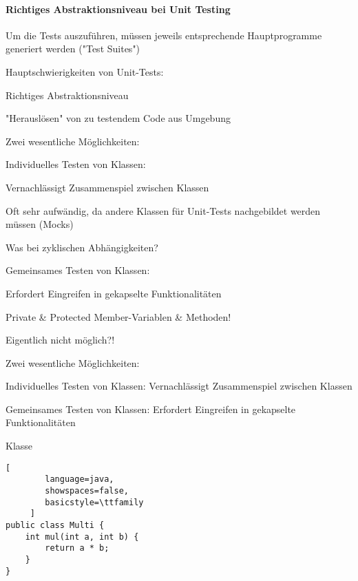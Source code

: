 \documentclass[10pt]{article}
\begin{document}
\paragraph{Richtiges Abstraktionsniveau bei Unit Testing}
\begin{itemize*}
  \item Um die Tests auszuführen, müssen jeweils entsprechende Hauptprogramme generiert werden ("Test Suites")
  \item Hauptschwierigkeiten von Unit-Tests:
  \begin{itemize*}
    \item Richtiges Abstraktionsniveau
    \item "Herauslösen" von zu testendem Code aus Umgebung
  \end{itemize*}
  \item Zwei wesentliche Möglichkeiten:
  \begin{itemize*}
    \item Individuelles Testen von Klassen:
    \begin{itemize*}
      \item Vernachlässigt Zusammenspiel zwischen Klassen
      \item Oft sehr aufwändig, da andere Klassen für Unit-Tests nachgebildet werden müssen (Mocks)
      \item Was bei zyklischen Abhängigkeiten?
    \end{itemize*}
    \item Gemeinsames Testen von Klassen:
    \begin{itemize*}
      \item Erfordert Eingreifen in gekapselte Funktionalitäten
      \item Private \& Protected Member-Variablen \& Methoden!
      \item Eigentlich nicht möglich?!
    \end{itemize*}
  \end{itemize*}
\end{itemize*}

Zwei wesentliche Möglichkeiten:
\begin{itemize*}
  \item Individuelles Testen von Klassen: Vernachlässigt Zusammenspiel zwischen Klassen
  \item Gemeinsames Testen von Klassen: Erfordert Eingreifen in gekapselte Funktionalitäten
\end{itemize*}

Klasse
\begin{lstlisting}[
        language=java,
        showspaces=false,
        basicstyle=\ttfamily
     ]
public class Multi {
    int mul(int a, int b) {
        return a * b;
    }
}
\end{lstlisting}
\end{document}
